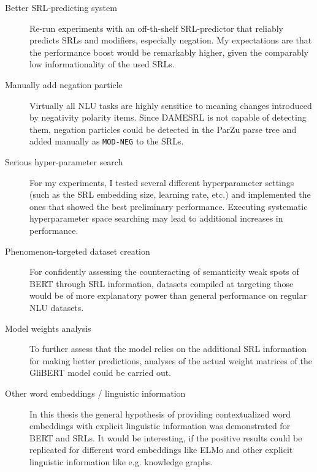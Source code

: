 \begin{description}
  \item[Better SRL-predicting system] Re-run experiments with an off-th-shelf SRL-predictor that reliably
    predicts SRLs and modifiers, especially negation. My expectations are that the performance boost would
    be remarkably higher, given the comparably low informationality of the used SRLs.
  \item[Manually add negation particle] Virtually all NLU tasks are highly sensitice to
    meaning changes introduced by negativity polarity items. Since DAMESRL is not capable
    of detecting them, negation particles could be detected in the ParZu parse tree and
    added manually as \texttt{MOD-NEG} to the SRLs.
  \item[Serious hyper-parameter search] For my experiments, I tested several different hyperparameter
    settings (such as the SRL embedding size, learning rate, etc.) and implemented the ones that
    showed the best preliminary performance. Executing systematic hyperparameter space searching may
    lead to additional increases in performance.
  \item[Phenomenon-targeted dataset creation] For confidently assessing the counteracting of semanticity
    weak spots of BERT through SRL information, datasets compiled at targeting those would be of more
    explanatory power than general performance on regular NLU datasets.
  \item[Model weights analysis] To further assess that the model relies on the additional SRL information for
    making better predictions, analyses of the actual weight matrices of the GliBERT model could be carried out.
  \item[Other word embeddings / linguistic information] In this thesis the general hypothesis of providing
    contextualized word embeddings with explicit linguistic information was demonstrated for BERT and SRLs.
    It would be interesting, if the positive results could be replicated for different word embeddings like
    ELMo and other explicit linguistic information like e.g. knowledge graphs.
\end{description}


